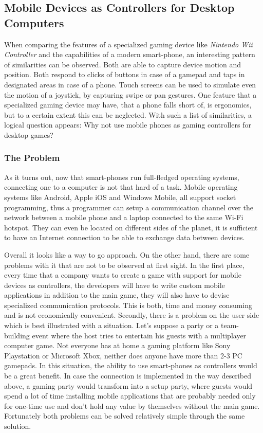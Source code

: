 
\subsection{Mobile Devices as Controllers for Desktop Computers}

When comparing the features of a specialized gaming device like \emph{Nintendo Wii Controller} and the capabilities of a modern smart-phone, an interesting pattern of similarities can be observed. Both are able to capture device motion and position. Both respond to clicks of buttons in case of a gamepad and taps in designated areas in case of a phone. Touch screens can be used to simulate even the motion of a joystick, by capturing swipe or pan gestures. One feature that a specialized gaming device may have, that a phone falls short of, is ergonomics, but to a certain extent this can be neglected. With such a list of similarities, a logical question appears: Why not use mobile phones as gaming controllers for desktop games?

\subsubsection{The Problem}

As it turns out, now that smart-phones run full-fledged operating systems, connecting one to a computer is not that hard of a task. Mobile operating systems like Android, Apple iOS and Windows Mobile, all support socket programming, thus a programmer can setup a communication channel over the network between a mobile phone and a laptop connected to the same Wi-Fi hotspot. They can even be located on different sides of the planet, it is sufficient to have an Internet connection to be able to exchange data between devices.

Overall it looks like a way to go approach. On the other hand, there are some problems with it that are not to be observed at first sight. In the first place, every time that a company wants to create a game with support for mobile devices as controllers, the developers will have to write custom mobile applications in addition to the main game, they will also have to devise specialized communication protocols. This is both, time and money consuming and is not economically convenient. Secondly, there is a problem on the user side which is best illustrated with a situation. Let's suppose a party or a team-building event where the host tries to entertain his guests with a multiplayer computer game. Not everyone has at home a gaming platform like Sony Playstation or Microsoft Xbox, neither does anyone have more than 2-3 PC gamepads. In this situation, the ability to use smart-phones as controllers would be a great benefit. In case the connection is implemented in the way described above, a gaming party would transform into a setup party, where guests would spend a lot of time installing mobile applications that are probably needed only for one-time use and don't hold any value by themselves without the main game. Fortunately both problems can be solved relatively simple through the same solution.

